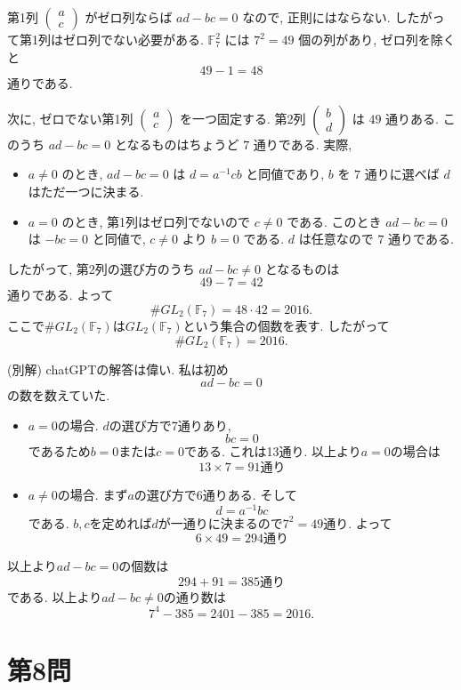 \documentclass[uplatex,dvipdfmx,a4paper,14pt]{jsarticle}
\newcommand{\F}{\mathbb{F}}
\begin{document}
第1列 $\begin{pmatrix}a\\c\end{pmatrix}$ がゼロ列ならば $ad-bc=0$ なので, 正則にはならない. したがって第1列はゼロ列でない必要がある. $\F_7^2$ には $7^2=49$ 個の列があり, ゼロ列を除くと
\[
49-1=48
\]
通りである.

次に, ゼロでない第1列 $\begin{pmatrix}a\\c\end{pmatrix}$ を一つ固定する. 第2列 $\begin{pmatrix}b\\d\end{pmatrix}$ は $49$ 通りある. このうち $ad-bc=0$ となるものはちょうど $7$ 通りである. 実際,
\begin{itemize}
\item $a\ne0$ のとき, $ad-bc=0$ は $d=a^{-1}cb$ と同値であり, $b$ を $7$ 通りに選べば $d$ はただ一つに決まる.
\item $a=0$ のとき, 第1列はゼロ列でないので $c\ne0$ である. このとき $ad-bc=0$ は $-bc=0$ と同値で, $c\ne0$ より $b=0$ である. $d$ は任意なので $7$ 通りである.
\end{itemize}
したがって, 第2列の選び方のうち $ad-bc\ne0$ となるものは
\[
49-7=42
\]
通りである. よって
\[
\#GL_2(\F_7)=48\cdot42=2016.
\]
ここで$\#GL_2(\F_7)$は$GL_2(\F_7)$という集合の個数を表す. したがって
\[
\boxed{\#GL_2(\F_7)=2016.}
\]


(別解) chatGPTの解答は偉い. 私は初め
$$
ad-bc=0
$$
の数を数えていた. 
\begin{itemize}
\item $a=0$の場合. $d$の選び方で7通りあり, 
$$
bc=0
$$
であるため$b=0$または$c=0$である. これは13通り.
以上より$a=0$の場合は
$$13 \times 7=91\text{通り}$$
\item $a\neq0$の場合. まず$a$の選び方で6通りある. そして
$$
d = a^{-1}bc
$$
である. $b, c$を定めれば$d$が一通りに決まるので$7^2=49$通り.
よって
$$
6 \times 49= 294
\text{通り}
$$
\end{itemize}
以上より$ad-bc=0$の個数は
$$
294+91=385
\text{通り}
$$
である. 
以上より$ad-bc \neq 0$の通り数は
$$
7^4 - 385=2401 - 385 =2016.
$$



\section*{第8問}
\end{document}

